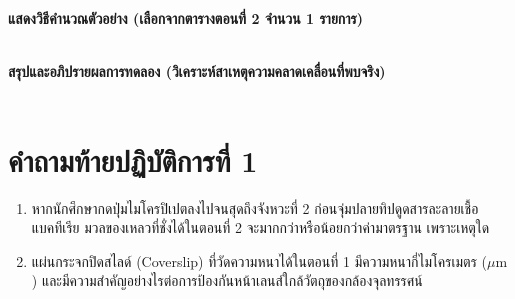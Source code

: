\begin{worksheetbox}
\vspace{4pt}
\noindent\textbf{แสดงวิธีคำนวณตัวอย่าง (เลือกจากตารางตอนที่ 2 จำนวน 1 รายการ)}\\[4pt]
\dotfill\\[6pt]
\dotfill

\noindent\textbf{สรุปและอภิปรายผลการทดลอง (วิเคราะห์สาเหตุความคลาดเคลื่อนที่พบจริง)}\\[4pt]
\dotfill\\[6pt]
\dotfill
\end{worksheetbox}

\section*{คำถามท้ายปฏิบัติการที่ 1}
\begin{enumerate}
    \item หากนักศึกษากดปุ่มไมโครปิเปตลงไปจนสุดถึงจังหวะที่ 2 ก่อนจุ่มปลายทิปดูดสารละลายเชื้อแบคทีเรีย มวลของเหลวที่ชั่งได้ในตอนที่ 2 จะมากกว่าหรือน้อยกว่าค่ามาตรฐาน เพราะเหตุใด
    \item แผ่นกระจกปิดสไลด์ (Coverslip) ที่วัดความหนาได้ในตอนที่ 1 มีความหนากี่ไมโครเมตร ($\mu\text{m}$) และมีความสำคัญอย่างไรต่อการป้องกันหน้าเลนส์ใกล้วัตถุของกล้องจุลทรรศน์
\end{enumerate}
